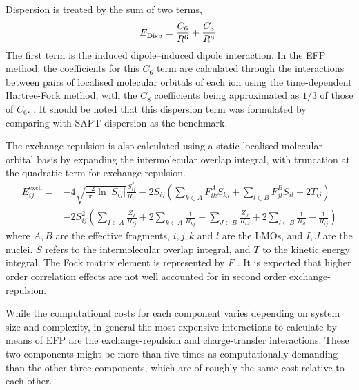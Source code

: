 Dispersion is treated by the sum of two terms,
\begin{equation}
     E^{\text{}}_{\text{Disp}}  = \frac{C_6}{R^6} + \frac{C_8}{R^8}.
\end{equation}
The first term is the induced dipole--induced dipole interaction.
In the EFP method, the coefficients for this $C_6$ term are calculated through the interactions between pairs of localised molecular orbitals of each ion using the time-dependent Hartree-Fock method, with the $C_8$ coefficients being approximated as $1/3$ of those of $C_6$.
\cite{Adamovic2005a}.
It should be noted that this dispersion term was formulated by comparing with SAPT dispersion as the benchmark.


The exchange-repulsion is also calculated using a static localised molecular orbital basis by expanding the intermolecular overlap integral, with truncation at the quadratic term for exchange-repulsion.
\begin{equation}
   \begin{split}
    E^{\text{exch}}_{ij} = & -4 \sqrt{\frac{-2}{\pi} \ln \lvert S_{ij} \rvert } \frac{S^2_{ij}}{R_{ij}} 
                             -2 S_{ij} \left( \sum_{k \in A} F^A_{ik} S_{kj} + \sum_{l \in B} F^B_{jl}S_{il} - 2 T_{ij} \right) \\
                             &  -2 S^2_{ij} \left( \sum_{I \in A} \frac{Z_I}{R_{Ij}}  + 2 \sum_{k \in A} \frac{1}{R_{kj}} + 
                                 \sum_{J \in B} \frac{Z_J}{R_{iJ}} + 2 \sum_{l \in B} \frac{1}{R_{il}} - \frac{1}{R_{ij}} \right)
   \end{split}
\end{equation}
where $A,B$ are the effective fragments, $i, j, k$ and $l$ are the LMOs, and $I, J$ are the nuclei. 
$S$ refers to the intermolecular overlap integral, and $T$ to the kinetic energy integral.
The Fock matrix element is represented by $F$
\cite{Ghosh2010a}.
It is expected that higher order correlation effects are not well accounted for in second order exchange-repulsion.

While the computational costs for each component varies depending on system size and complexity, in general the most expensive interactions to calculate by means of EFP are the exchange-repulsion and charge-transfer interactions.
These two components might be more than five times as computationally demanding than the other three components, which are of roughly the same cost relative to each other.


